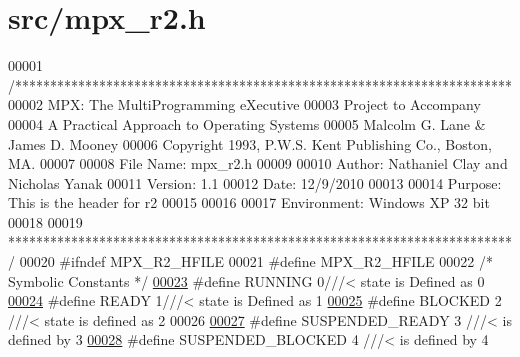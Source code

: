 \hypertarget{mpx__r2_8h_source}{
\section{src/mpx\_\-r2.h}
}

\begin{DoxyCode}
00001 \textcolor{comment}{/***********************************************************************}
00002 \textcolor{comment}{        MPX: The MultiProgramming eXecutive}
00003 \textcolor{comment}{        Project to Accompany}
00004 \textcolor{comment}{        A Practical Approach to Operating Systems}
00005 \textcolor{comment}{        Malcolm G. Lane & James D. Mooney}
00006 \textcolor{comment}{        Copyright 1993, P.W.S. Kent Publishing Co., Boston, MA.}
00007 \textcolor{comment}{}
00008 \textcolor{comment}{        File Name:      mpx\_r2.h}
00009 \textcolor{comment}{}
00010 \textcolor{comment}{        Author: Nathaniel Clay and Nicholas Yanak}
00011 \textcolor{comment}{        Version: 1.1}
00012 \textcolor{comment}{        Date:  12/9/2010}
00013 \textcolor{comment}{}
00014 \textcolor{comment}{        Purpose: This is the header for r2}
00015 \textcolor{comment}{}
00016 \textcolor{comment}{                }
00017 \textcolor{comment}{        Environment: Windows XP 32 bit}
00018 \textcolor{comment}{}
00019 \textcolor{comment}{************************************************************************/}
00020 \textcolor{preprocessor}{#ifndef MPX\_R2\_HFILE}
00021 \textcolor{preprocessor}{}\textcolor{preprocessor}{#define MPX\_R2\_HFILE}
00022 \textcolor{preprocessor}{}\textcolor{comment}{/* Symbolic Constants */}
\hypertarget{mpx__r2_8h_source_l00023}{}\hyperlink{mpx__r2_8h_a6fb7181d994ee98e735494be55809708}{00023} \textcolor{preprocessor}{#define RUNNING  0///< state is Defined as 0}
\hypertarget{mpx__r2_8h_source_l00024}{}\hyperlink{mpx__r2_8h_ad1235d5ce36f7267285e82dccd428aa6}{00024} \textcolor{preprocessor}{}\textcolor{preprocessor}{#define READY   1///< state is Defined as  1}
\hypertarget{mpx__r2_8h_source_l00025}{}\hyperlink{mpx__r2_8h_a48f6457243719e7031768d4100741159}{00025} \textcolor{preprocessor}{}\textcolor{preprocessor}{#define BLOCKED 2 ///< state is defined as 2}
00026 \textcolor{preprocessor}{}
\hypertarget{mpx__r2_8h_source_l00027}{}\hyperlink{mpx__r2_8h_a07b1141143e8825b04670da23fca8cc7}{00027} \textcolor{preprocessor}{#define SUSPENDED\_READY    3 ///< is defined by 3}
\hypertarget{mpx__r2_8h_source_l00028}{}\hyperlink{mpx__r2_8h_a6e41bb5a80c5049e8d364bab8ee4d73a}{00028} \textcolor{preprocessor}{}\textcolor{preprocessor}{#define SUSPENDED\_BLOCKED  4 ///< is defined by 4}

\end{DoxyCode}
